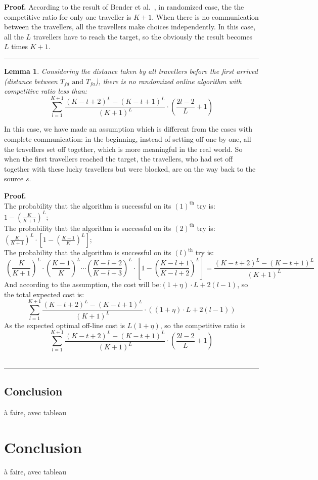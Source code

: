 \documentclass[a4paper, 10pt]{article}
\newtheorem{lemma}{Lemma}
\newenvironment{proof}[1][Proof]{\textbf{#1.} }{\ \rule{0.5em}{0.5em}}
\begin{document}
\begin{proof} 
According to the result of Bender et al.~\cite{BeWe15}, in randomized case, the the competitive ratio for only one traveller is $K+1$. When there is no communication between the travellers, all the travellers make choices independently. In this case, all the $L$ travellers have to reach the target, so the obviously the result becomes $L$ times $K+1$.
\end{proof}

\begin{lemma}
Considering the distance taken by all travellers before the first arrived (distance between $T_{fd} \mbox{\ and } T_{fa}$), there is no randomized online algorithm with competitive ratio less than:
\[
\sum_{l=1}^{K+1}\frac{(K-t+2)^{L} - (K-t+1)^{L}}{(K+1)^{L}}\cdot (\frac{2l-2}{L}+1)
\]
\end{lemma}

In this case, we have made an assumption which is different from the cases with complete communication: in the beginning, instead of setting off one by one, all the travellers set off together, which is more meaningful in the real world. So when the first travellers reached the target, the travellers, who had set off together with these lucky travellers but were blocked, are on the way back to the source $s$.

\begin{proof} 
\\The probability that the algorithm is successful on its $(1)^{\text{th}}$ try is: $1-(\frac{K}{K+1})^{L}$;
\\The probability that the algorithm is successful on its $(2)^{\text{th}}$ try is: $(\frac{K}{K+1})^{L} \cdot [1-(\frac{K-1}{K})^{L}]$;
\\The probability that the algorithm is successful on its $(l)^{\text{th}}$ try is: 
\[
\ (\frac{K}{K+1})^{L} \cdot  (\frac{K-1}{K})^{L}\cdots  (\frac{K-l+2}{K-l+3})^{L}\cdot [1-(\frac{K-l+1}{K-l+2})^{L}] = \frac{(K-t+2)^{L} - (K-t+1)^{L}}{(K+1)^{L}}
\]
And according to the assumption, the cost will be:$(1+\eta)\cdot L + 2(l-1) $, so the total expected cost is:
\[
\sum_{l=1}^{K+1}\frac{(K-t+2)^{L} - (K-t+1)^{L}}{(K+1)^{L}}\cdot ((1+\eta)\cdot L + 2(l-1) )
\]
As the expected optimal off-line cost is $L(1 + \eta)$, so the competitive ratio is 
\[
\sum_{l=1}^{K+1}\frac{(K-t+2)^{L} - (K-t+1)^{L}}{(K+1)^{L}}\cdot (\frac{2l-2}{L}+1)
\]
\end{proof}

\subsection{Conclusion} 

 à faire, avec tableau


\section{Conclusion}

à faire, avec tableau





\end{document}
